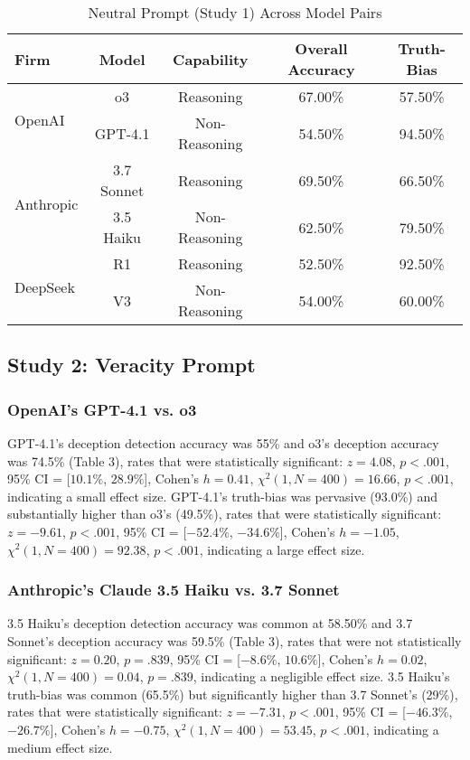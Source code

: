 \documentclass{article}
\begin{document}
\begin{table}[ht]
\centering
\caption{Neutral Prompt (Study 1) Across Model Pairs}
\begin{tabular}{lcccc}
\toprule
\textbf{Firm} & \textbf{Model} & \textbf{Capability} & \textbf{Overall Accuracy} & \textbf{Truth-Bias} \\
\midrule
\multirow{2}{*}{OpenAI} & o3 & Reasoning & 67.00\% & 57.50\%  \\
& GPT-4.1 & Non-Reasoning & 54.50\% & 94.50\% \\
\midrule
\multirow{2}{*}{Anthropic} & 3.7 Sonnet & Reasoning & 69.50\% & 66.50\% \\
& 3.5 Haiku & Non-Reasoning & 62.50\% & 79.50\% \\
\midrule
\multirow{2}{*}{DeepSeek} & R1 & Reasoning & 52.50\% & 92.50\% \\
& V3 & Non-Reasoning & 54.00\% & 60.00\% \\
\bottomrule
\end{tabular}
\label{tab:study1_model_comparison}
\end{table}

\subsection{Study 2: Veracity Prompt}

\subsubsection{OpenAI's GPT-4.1 vs. o3}

GPT-4.1's deception detection accuracy was 55\% and o3's deception accuracy was 74.5\% (Table 3), rates that were statistically significant:  $z = 4.08$, $p < .001$, 95\% CI = [$10.1\%$, $28.9\%$], Cohen’s $h =0.41$, $\chi^2(1, N = 400) = 16.66$, $p < .001$, indicating a small effect size. GPT-4.1's truth-bias was pervasive (93.0\%) and substantially higher than o3's (49.5\%), rates that were statistically significant: $z = -9.61$, $p < .001$, 95\% CI = [$-52.4\%$, $-34.6\%$], Cohen’s $h = -1.05$, $\chi^2(1, N = 400) = 92.38$, $p < .001$, indicating a large effect size.

\subsubsection{Anthropic's Claude 3.5 Haiku vs. 3.7 Sonnet}

3.5 Haiku's deception detection accuracy was common at 58.50\% and 3.7 Sonnet's deception accuracy was 59.5\% (Table 3), rates that were not statistically significant:  $z = 0.20$, $p = .839$, 95\% CI = [$-8.6\%$, $10.6\%$], Cohen’s $h =0.02$, $\chi^2(1, N = 400) = 0.04$, $p = .839$, indicating a negligible effect size. 3.5 Haiku's truth-bias was common (65.5\%) but significantly higher than 3.7 Sonnet's (29\%), rates that were statistically significant: $z = -7.31$, $p < .001$, 95\% CI = [$-46.3\%$, $-26.7\%$], Cohen’s $h = -0.75$, $\chi^2(1, N = 400) = 53.45$, $p < .001$, indicating a medium effect size.
\end{document}
